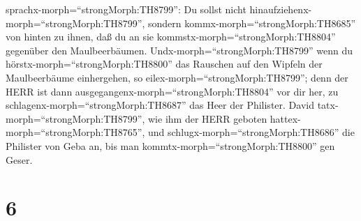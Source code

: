 sprachx-morph=``strongMorph:TH8799'': Du sollst nicht
hinaufziehenx-morph=``strongMorph:TH8799'', sondern
kommx-morph=``strongMorph:TH8685'' von hinten zu ihnen, daß du an sie
kommstx-morph=``strongMorph:TH8804'' gegenüber den Maulbeerbäumen.
 Undx-morph=``strongMorph:TH8799'' wenn du
hörstx-morph=``strongMorph:TH8800'' das Rauschen auf den Wipfeln der
Maulbeerbäume einhergehen, so eilex-morph=``strongMorph:TH8799''; denn
der HERR ist dann ausgegangenx-morph=``strongMorph:TH8804'' vor dir her,
zu schlagenx-morph=``strongMorph:TH8687'' das Heer der Philister.
 David tatx-morph=``strongMorph:TH8799'', wie ihm der HERR
geboten hattex-morph=``strongMorph:TH8765'', und
schlugx-morph=``strongMorph:TH8686'' die Philister von Geba an, bis man
kommtx-morph=``strongMorph:TH8800'' gen Geser.

\hypertarget{section-5}{%
\section{6}\label{section-5}}

